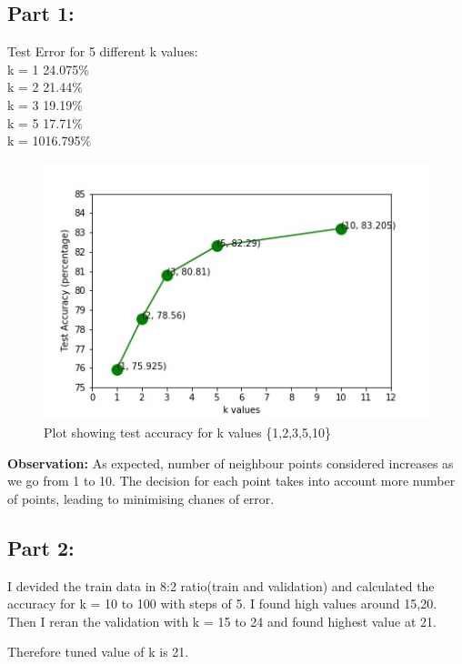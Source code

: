 \documentclass[a4paper,11pt]{article}
\newcommand\tab[1][0.6cm]{\hspace*{#1}}
\begin{document}
\begin{mlsolution}
\subsection*{Part 1:}
Test Error for 5 different k values:\\
\tab k = 1 \tab \tab 24.075\%\\
\tab k = 2 \tab \tab 21.44\%\\
\tab k = 3 \tab \tab 19.19\%\\
\tab k = 5 \tab \tab 17.71\%\\
\tab k = 10\tab \tab 16.795\%\\

\begin{figure}[th]
\centering
\includegraphics[width=\columnwidth]{q6_1.jpg}
\caption{Plot showing test accuracy for k values \{1,2,3,5,10\}}
\label{fig:proto}
\end{figure}
\textbf{Observation:}
 As expected, number of neighbour points considered increases as we go from 1 to 10. The decision for each point takes into account more number of points, leading to minimising chanes of error.

\subsection*{Part 2:}
  I devided the train data in 8:2 ratio(train and validation) and calculated the accuracy for k = 10 to 100 with steps of 5. I found high values around 15,20. Then I reran the validation with k = 15 to 24 and found highest value at 21.

Therefore tuned value of k is 21.


\end{mlsolution}
\end{document}
